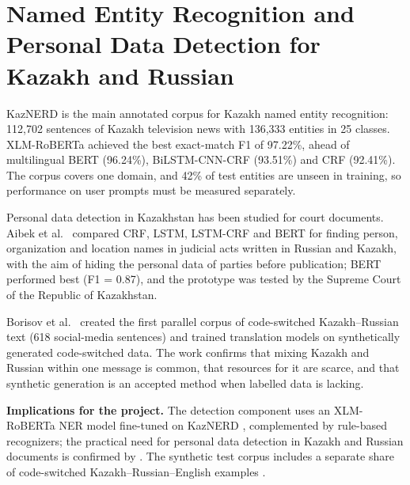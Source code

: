 \documentclass[12pt,a4paper]{article}
\begin{document}
\section{Named Entity Recognition and Personal Data Detection for Kazakh and Russian}

KazNERD \cite{r14} is the main annotated corpus for Kazakh named entity recognition: 112,702 sentences of Kazakh television news with 136,333 entities in 25 classes. XLM-RoBERTa achieved the best exact-match F1 of 97.22\%, ahead of multilingual BERT (96.24\%), BiLSTM-CNN-CRF (93.51\%) and CRF (92.41\%). The corpus covers one domain, and 42\% of test entities are unseen in training, so performance on user prompts must be measured separately.

Personal data detection in Kazakhstan has been studied for court documents. Aibek et al.~\cite{r15} compared CRF, LSTM, LSTM-CRF and BERT for finding person, organization and location names in judicial acts written in Russian and Kazakh, with the aim of hiding the personal data of parties before publication; BERT performed best (F1 = 0.87), and the prototype was tested by the Supreme Court of the Republic of Kazakhstan.

Borisov et al.~\cite{r16} created the first parallel corpus of code-switched Kazakh--Russian text (618 social-media sentences) and trained translation models on synthetically generated code-switched data. The work confirms that mixing Kazakh and Russian within one message is common, that resources for it are scarce, and that synthetic generation is an accepted method when labelled data is lacking.

\textbf{Implications for the project.} The detection component uses an XLM-RoBERTa NER model fine-tuned on KazNERD \cite{r14}, complemented by rule-based recognizers; the practical need for personal data detection in Kazakh and Russian documents is confirmed by \cite{r15}. The synthetic test corpus includes a separate share of code-switched Kazakh--Russian--English examples \cite{r16}.
\end{document}
